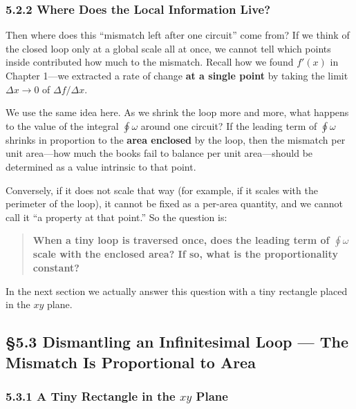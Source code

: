 \documentclass[a4paper,12pt,openany]{book}
\begin{document}
\hypertarget{where-does-the-local-information-live}{%
\subsubsection{5.2.2 Where Does the Local Information
Live?}\label{where-does-the-local-information-live}}

Then where does this ``mismatch left after one circuit'' come from? If
we think of the closed loop only at a global scale all at once, we
cannot tell which points inside contributed how much to the mismatch.
Recall how we found \(f'(x)\) in Chapter 1—we extracted a rate of
change \textbf{at a single point} by taking the limit \(\Delta x \to 0\)
of \(\Delta f / \Delta x\).

We use the same idea here. As we shrink the loop more and more, what
happens to the value of the integral \(\oint \omega\) around one
circuit? If the leading term of \(\oint \omega\) shrinks in proportion
to the \textbf{area enclosed} by the loop, then the mismatch per unit
area—how much the books fail to balance per unit area—should be
determined as a value intrinsic to that point.

Conversely, if it does not scale that way (for example, if it scales
with the perimeter of the loop), it cannot be fixed as a per-area
quantity, and we cannot call it ``a property at that point.'' So the
question is:

\begin{quote}
\textbf{When a tiny loop is traversed once, does the leading term of $\oint \omega$ scale with the enclosed area? If so, what is the proportionality constant?}
\end{quote}

In the next section we actually answer this question with a tiny
rectangle placed in the \(xy\) plane.

\par\vspace{0.35em}\par

\hypertarget{dismantling-an-infinitesimal-loop-the-mismatch-is-proportional-to-area}{%
\subsection{§5.3 Dismantling an Infinitesimal Loop — The Mismatch Is
Proportional to
Area}\label{dismantling-an-infinitesimal-loop-the-mismatch-is-proportional-to-area}}

\hypertarget{a-tiny-rectangle-in-the-xy-plane}{%
\subsubsection{\texorpdfstring{5.3.1 A Tiny Rectangle in the \(xy\)
Plane}{5.3.1 A Tiny Rectangle in the xy Plane}}\label{a-tiny-rectangle-in-the-xy-plane}}
\end{document}

